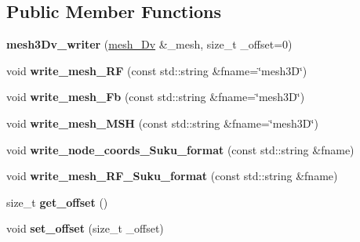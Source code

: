\subsection*{Public Member Functions}
\begin{DoxyCompactItemize}
\item 
\mbox{\label{classStemMesh3D_1_1mesh3Dv__writer_aae078d7b6c386a8b7f52ab28327caa6f}} 
{\bfseries mesh3\+Dv\+\_\+writer} (\hyperlink{classStemMesh3D_1_1mesh__3Dv}{mesh\+\_\+Dv} \&\+\_\+mesh, size\+\_\+t \+\_\+offset=0)
\item 
\mbox{\label{classStemMesh3D_1_1mesh3Dv__writer_aa52af5320c8e803cd545dda23fcabb35}} 
void {\bfseries write\+\_\+mesh\+\_\+\+RF} (const std\+::string \&fname=\char`\"{}mesh3D\char`\"{})
\item 
\mbox{\label{classStemMesh3D_1_1mesh3Dv__writer_a0f9451cb63615486da604d9fd4f5e81e}} 
void {\bfseries write\+\_\+mesh\+\_\+\+Fb} (const std\+::string \&fname=\char`\"{}mesh3D\char`\"{})
\item 
\mbox{\label{classStemMesh3D_1_1mesh3Dv__writer_adb50b614cf1af342128afa716453837e}} 
void {\bfseries write\+\_\+mesh\+\_\+\+M\+SH} (const std\+::string \&fname=\char`\"{}mesh3D\char`\"{})
\item 
\mbox{\label{classStemMesh3D_1_1mesh3Dv__writer_af2db4004e9f0914b373757bec47bbc3b}} 
void {\bfseries write\+\_\+node\+\_\+coords\+\_\+\+Suku\+\_\+format} (const std\+::string \&fname)
\item 
\mbox{\label{classStemMesh3D_1_1mesh3Dv__writer_aa38443a40c4c444704ff4d04de6299c6}} 
void {\bfseries write\+\_\+mesh\+\_\+\+R\+F\+\_\+\+Suku\+\_\+format} (const std\+::string \&fname)
\item 
\mbox{\label{classStemMesh3D_1_1mesh3Dv__writer_ad48372d1a5e4b4de2487495da624c790}} 
size\+\_\+t {\bfseries get\+\_\+offset} ()
\item 
\mbox{\label{classStemMesh3D_1_1mesh3Dv__writer_abd36bcea35434ec6be611efd550d91e8}} 
void {\bfseries set\+\_\+offset} (size\+\_\+t \+\_\+offset)
\end{DoxyCompactItemize}
